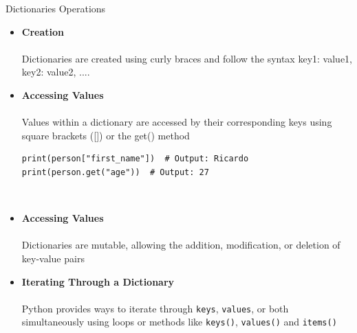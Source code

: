 \documentclass[
	11pt, 
]{beamer}
\begin{document}
\begin{frame}[fragile]{Dictionaries Operations}

\begin{itemize}
    \item \textbf{Creation} \\ \\
    Dictionaries are created using curly braces {} and follow the syntax {key1: value1, key2: value2, ...}.
    
    \item \textbf{Accessing Values} \\ \\
    Values within a dictionary are accessed by their corresponding keys using square brackets ([]) or the get() method

\begin{verbatim}
print(person["first_name"])  # Output: Ricardo
print(person.get("age"))  # Output: 27
\end{verbatim}
    \\
    \item \textbf{Accessing Values} \\ \\
     Dictionaries are mutable, allowing the addition, modification, or deletion of key-value pairs

    \item \textbf{ Iterating Through a Dictionary} \\ \\
     Python provides ways to iterate through \texttt{keys}, \texttt{values}, or both simultaneously using loops or methods like \texttt{keys()}, \texttt{values()} and \texttt{items()}
\end{itemize}
\end{frame}

\end{document}
